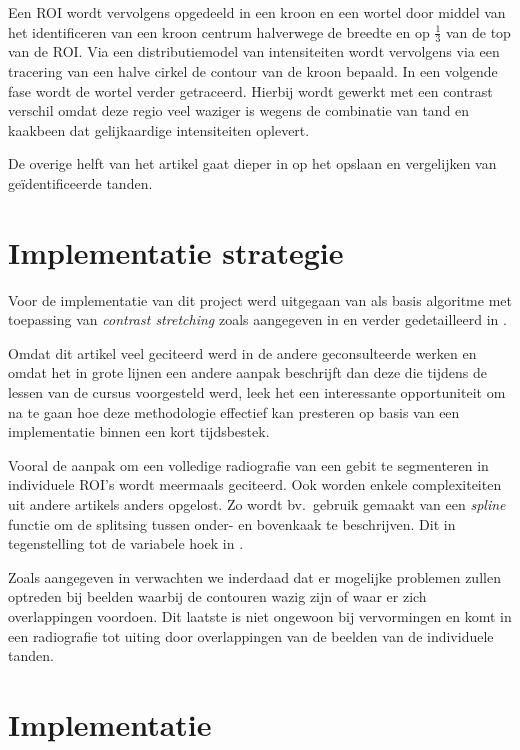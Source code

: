 \documentclass[10pt,a4paper]{article}
\begin{document}
Een ROI wordt vervolgens opgedeeld in een kroon en een wortel door middel van het identificeren van een kroon centrum halverwege de breedte en op $\frac{1}{3}$ van de top van de ROI. Via een distributiemodel van intensiteiten wordt vervolgens via een tracering van een halve cirkel de contour van de kroon bepaald. In een volgende fase wordt de wortel verder getraceerd. Hierbij wordt gewerkt met een contrast verschil omdat deze regio veel waziger is wegens de combinatie van tand en kaakbeen dat gelijkaardige intensiteiten oplevert.

De overige helft van het artikel gaat dieper in op het opslaan en vergelijken van ge\"identificeerde tanden.

\section*{Implementatie strategie}

Voor de implementatie van dit project werd uitgegaan van \cite{jain2004matching} als basis algoritme met toepassing van  \emph{contrast stretching} zoals aangegeven in \cite{piotrowski2000active} en verder gedetailleerd in \cite{said2004dental}.

Omdat dit artikel veel geciteerd werd in de andere geconsulteerde werken en omdat het in grote lijnen een andere aanpak beschrijft dan deze die tijdens de lessen van de cursus voorgesteld werd, leek het een interessante opportuniteit om na te gaan hoe deze methodologie effectief kan presteren op basis van een implementatie binnen een kort tijdsbestek.

Vooral de aanpak om een volledige radiografie van een gebit te segmenteren in individuele ROI's wordt meermaals geciteerd. Ook worden enkele complexiteiten uit andere artikels anders opgelost. Zo wordt bv.\ gebruik gemaakt van een \emph{spline} functie om de splitsing tussen onder- en bovenkaak te beschrijven. Dit in tegenstelling tot de variabele hoek in \cite{abdel2003challenges}.

Zoals aangegeven in \cite{chen2004tooth} verwachten we inderdaad dat er mogelijke problemen zullen optreden bij beelden waarbij de contouren wazig zijn of waar er zich overlappingen voordoen. Dit laatste is niet ongewoon bij vervormingen en komt in een radiografie tot uiting door overlappingen van de beelden van de individuele tanden.

\section*{Implementatie}
\end{document}

